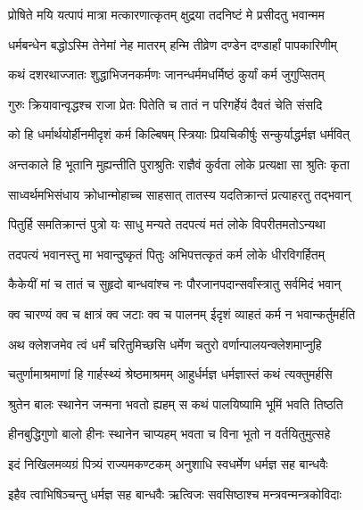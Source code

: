 \twolineshloka
{प्रोषिते मयि यत्पापं मात्रा मत्कारणात्कृतम्}
{क्षुद्रया तदनिष्टं मे प्रसीदतु भवान्मम} %

\twolineshloka
{धर्मबन्धेन बद्धोऽस्मि तेनेमां नेह मातरम्}
{हन्मि तीव्रेण दण्डेन दण्डार्हां पापकारिणीम्} %

\twolineshloka
{कथं दशरथाज्जातः शुद्धाभिजनकर्मणः}
{जानन्धर्ममधर्मिष्ठं कुर्यां कर्म जुगुप्सितम्} %

\twolineshloka
{गुरुः क्रियावान्वृद्धश्च राजा प्रेतः पितेति च}
{तातं न परिगर्हेयं दैवतं चेति संसदि} %

\twolineshloka
{को हि धर्मार्थयोर्हीनमीदृशं कर्म किल्बिषम्}
{स्त्रियाः प्रियचिकीर्षुः सन्कुर्याद्धर्मज्ञ धर्मवित्} %

\twolineshloka
{अन्तकाले हि भूतानि मुह्यन्तीति पुराश्रुतिः}
{राज्ञैवं कुर्वता लोके प्रत्यक्षा सा श्रुतिः कृता} %

\twolineshloka
{साध्वर्थमभिसंधाय क्रोधान्मोहाच्च साहसात्}
{तातस्य यदतिक्रान्तं प्रत्याहरतु तद्भवान्} %

\twolineshloka
{पितुर्हि समतिक्रान्तं पुत्रो यः साधु मन्यते}
{तदपत्यं मतं लोके विपरीतमतोऽन्यथा} %

\twolineshloka
{तदपत्यं भवानस्तु मा भवान्दुष्कृतं पितुः}
{अभिपत्तत्कृतं कर्म लोके धीरविगर्हितम्} %

\twolineshloka
{कैकेयीं मां च तातं च सुहृदो बान्धवांश्च नः}
{पौरजानपदान्सर्वांस्त्रातु सर्वमिदं भवान्} %

\twolineshloka
{क्व चारण्यं क्व च क्षात्रं क्व जटाः क्व च पालनम्}
{ईदृशं व्याहतं कर्म न भवान्कर्तुमर्हति} %

\twolineshloka
{अथ क्लेशजमेव त्वं धर्मं चरितुमिच्छसि}
{धर्मेण चतुरो वर्णान्पालयन्क्लेशमाप्नुहि} %

\twolineshloka
{चतुर्णामाश्रमाणां हि गार्हस्थ्यं श्रेष्ठमाश्रमम्}
{आहुर्धर्मज्ञ धर्मज्ञास्तं कथं त्यक्तुमर्हसि} %

\twolineshloka
{श्रुतेन बालः स्थानेन जन्मना भवतो ह्यहम्}
{स कथं पालयिष्यामि भूमिं भवति तिष्ठति} %

\twolineshloka
{हीनबुद्धिगुणो बालो हीनः स्थानेन चाप्यहम्}
{भवता च विना भूतो न वर्तयितुमुत्सहे} %

\twolineshloka
{इदं निखिलमव्यग्रं पित्र्यं राज्यमकण्टकम्}
{अनुशाधि स्वधर्मेण धर्मज्ञ सह बान्धवैः} %

\twolineshloka
{इहैव त्वाभिषिञ्चन्तु धर्मज्ञ सह बान्धवैः}
{ऋत्विजः सवसिष्ठाश्च मन्त्रवन्मन्त्रकोविदाः} %


